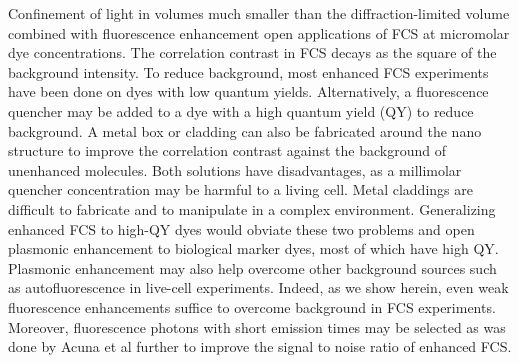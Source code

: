 \documentclass[journal=jacsat,manuscript=article]{achemso}
\begin{document}
Confinement of light in volumes much smaller than the diffraction-limited volume combined with fluorescence enhancement open applications of FCS at micromolar dye concentrations. The correlation contrast in FCS decays as the square of the background intensity. To reduce background, most enhanced FCS experiments have been done on dyes with low quantum yields.\cite{kinkhabwala2012fluorescence,estrada200810000} Alternatively, a fluorescence quencher may be added to a dye with a high quantum yield (QY) to reduce background.\cite{punj2013a,punj2013gold} A metal box or cladding\cite{ghenuche2015matching} can also be fabricated around the nano structure to improve the correlation contrast against the background of unenhanced molecules. Both solutions have disadvantages, as a millimolar quencher concentration may be harmful to a living cell. Metal claddings are difficult to fabricate and to manipulate in a complex environment. Generalizing enhanced FCS to high-QY dyes would obviate these two problems and open plasmonic enhancement to biological marker dyes, most of which have high QY. Plasmonic enhancement may also help overcome other background sources such as autofluorescence in live-cell experiments. Indeed, as we show herein, even weak fluorescence enhancements suffice to overcome background in FCS experiments. Moreover, fluorescence photons with short emission times may be selected as was done by Acuna et al\cite{acuna2012fluorescence} further to improve the signal to noise ratio of enhanced FCS.\\
\end{document}
